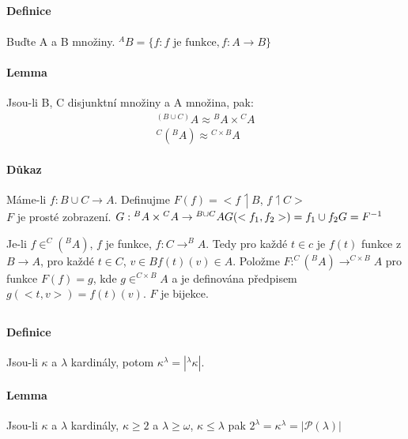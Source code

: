 \documentclass[a4paper,12pt,titlepage]{article}
\begin{document}
\subsection{}
\setcounter{equation}{0}
\paragraph{Definice}
Buďte A a B množiny. $^A B = \{f: f \text{ je funkce}, f: A \to B \}$
\paragraph{Lemma}
Jsou-li B, C disjunktní množiny a A množina, pak:
\begin{align}
	{}^{(B \cup C)} A \approx {}^B A \times {}^C A \\
	{}^C ( {}^B A ) \approx {}^{C\times B} A
\end{align}
\paragraph{Důkaz}
Máme-li $f: B \cup C \to A$. Definujme $F(f) = < f \upharpoonleft B$, $f
\upharpoonleft C >$ \\
$F$ je prosté zobrazení. $G: {}^BA \times {}^CA \to {}^{B\cup C}A \\
G(<f_1, f_2>) = f_1 \cup f_2 \\
G = F^{-1}$

Je-li $f \in ^C(^B A)$, $f$ je funkce, $f : C \to ^B A$. Tedy pro každé $t \in c$ je
$f(t)$ funkce z $B \to A$, pro každé $t \in C$, $v \in B f(t)(v) \in A$. Položme $F:
^C(^B A) \to ^{C \times B} A$ pro funkce $F(f) = g$, kde $g \in ^{C \times B} A$ a je
definována předpisem $g(<t, v>) = f(t)(v)$. $F$ je bijekce.




\subsection{}
\setcounter{equation}{0}
\paragraph{Definice}
Jsou-li $\kappa$ a $\lambda$ kardinály, potom $\kappa^\lambda = \left| ^\lambda
\kappa \right|$.

\paragraph{Lemma}
Jsou-li $\kappa$ a $\lambda$ kardinály, $\kappa \ge 2$ a $\lambda \ge \omega$,
$\kappa \le \lambda$ pak
$2^\lambda = \kappa^\lambda = |\mathcal{P}(\lambda)|$
\end{document}
